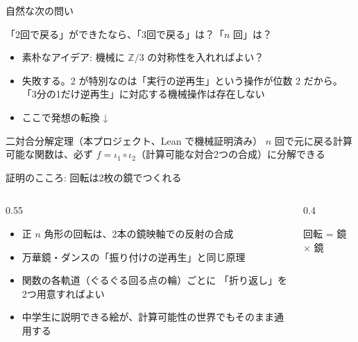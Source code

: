 \documentclass[aspectratio=169,11pt]{beamer}
\begin{document}
\begin{frame}{自然な次の問い}
  \begin{center}
    {\Large 「2回で戻る」ができたなら、「3回で戻る」は？「\(n\) 回」は？}
  \end{center}
  \vspace{1em}
  \begin{itemize}
    \item 素朴なアイデア: 機械に \(\mathbb{Z}/3\) の対称性を入れればよい？
    \item \alert{失敗する}。2 が特別なのは「実行の逆再生」という操作が位数 2 だから。
      「3分の1だけ逆再生」に対応する機械操作は存在しない
    \item ここで発想の転換 ↓
  \end{itemize}
  \begin{block}{二対合分解定理（本プロジェクト、Lean で機械証明済み）}
    \(n\) 回で元に戻る計算可能な関数は、必ず
    \(f = \iota_1 \circ \iota_2\)（計算可能な対合2つの合成）に分解できる
  \end{block}
\end{frame}

\begin{frame}{証明のこころ: 回転は2枚の鏡でつくれる}
  \begin{columns}
    \begin{column}{0.55\textwidth}
      \begin{itemize}
        \item 正 \(n\) 角形の回転は、2本の鏡映軸での反射の合成
        \item 万華鏡・ダンスの「振り付けの逆再生」と同じ原理
        \item 関数の各軌道（ぐるぐる回る点の輪）ごとに
          「折り返し」を2つ用意すればよい
        \item 中学生に説明できる絵が、計算可能性の世界でもそのまま通用する
      \end{itemize}
    \end{column}
    \begin{column}{0.4\textwidth}
      \centering

      \small 回転 = 鏡 \(\times\) 鏡
    \end{column}
  \end{columns}
\end{frame}
\end{document}
